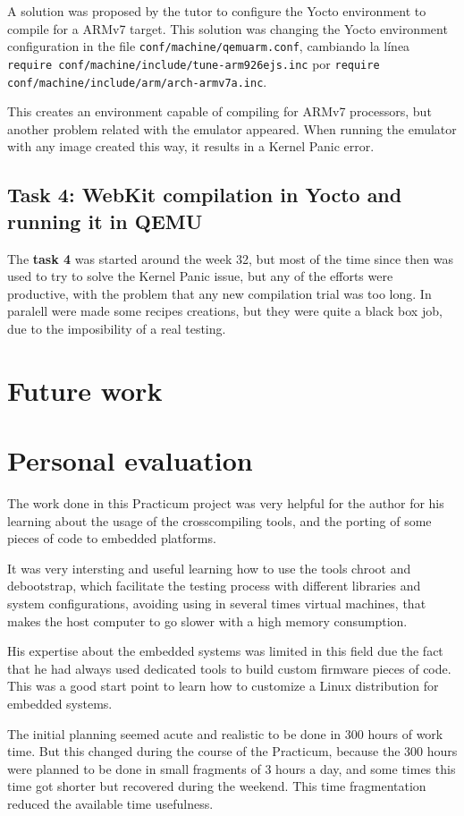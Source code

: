 \documentclass[a4paper,11pt,openany]{report}
\begin{document}
A solution was proposed by the tutor to configure the Yocto environment to compile for a ARMv7 target. This solution was changing the Yocto environment configuration in the file \verb#conf/machine/qemuarm.conf#, cambiando la línea \verb#require conf/machine/include/tune-arm926ejs.inc# por \verb#require conf/machine/include/arm/arch-armv7a.inc#.

This creates an environment capable of compiling for ARMv7 processors, but another problem related with the emulator appeared. When running the emulator with any image created this way, it results in a Kernel Panic error.

\section{Task 4: WebKit compilation in Yocto and running it in QEMU}
The \textbf{task 4} was started around the week 32, but most of the time since then was used to try to solve the Kernel Panic issue, but any of the efforts were productive, with the problem that any new compilation trial was too long. In paralell were made some recipes creations, but they were quite a black box job, due to the imposibility of a real testing.

\chapter{Future work}

\chapter{Personal evaluation}
The work done in this Practicum project was very helpful for the author for his learning about the usage of the crosscompiling tools, and the porting of some pieces of code to embedded platforms.

It was very intersting and useful learning how to use the tools chroot and debootstrap, which facilitate the testing process with different libraries and system configurations, avoiding using in several times virtual machines, that makes the host computer to go slower with a high memory consumption.

His expertise about the embedded systems was limited in this field due the fact that he had always used dedicated tools to build custom firmware pieces of code. This was a good start point to learn how to customize a Linux distribution for embedded systems.

The initial planning seemed acute and realistic to be done in 300 hours of work time. But this changed during the course of the Practicum, because the 300 hours were planned to be done in small fragments of 3 hours a day, and some times this time got shorter but recovered during the weekend. This time fragmentation reduced the available time usefulness.
\end{document}
